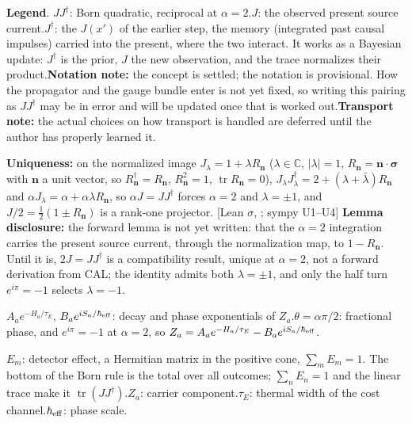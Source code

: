 \documentclass[10pt]{article}
\newcommand{\Cp}{\mathbb{C}}
\newcommand{\tr}{\operatorname{tr}}
\newcommand{\vs}[1]{\mathbf{#1}\!\cdot\!\boldsymbol\sigma}
\newcommand{\lean}[1]{\texttt{\detokenize{#1}}}
\newcommand{\tg}[1]{{\scriptsize[#1]}}
\begin{document}
\vspace{1pt}
\begin{smallbox}
\textbf{Legend}. $JJ^\dagger$: Born quadratic, reciprocal at $\alpha=2$.\quad $J$: the observed present source current.\quad $J^\dagger$: the $J(x')$ of the earlier step, the memory (integrated past causal impulses) carried into the present, where the two interact. It works as a Bayesian update: $J^\dagger$ is the prior, $J$ the new observation, and the trace normalizes their product.\quad \textbf{Notation note:} the concept is settled; the notation is provisional. How the propagator and the gauge bundle enter is not yet fixed, so writing this pairing as $JJ^\dagger$ may be in error and will be updated once that is worked out.\quad \textbf{Transport note:} the actual choices on how transport is handled are deferred until the author has properly learned it.\par\vspace{1pt}
\textbf{Uniqueness:} on the normalized image $J_\lambda=1+\lambda R_{\mathbf n}$ ($\lambda\in\Cp$, $|\lambda|=1$, $R_{\mathbf n}=\vs n$ with $\mathbf n$ a unit vector, so $R_{\mathbf n}^\dagger=R_{\mathbf n}$, $R_{\mathbf n}^2=1$, $\tr R_{\mathbf n}=0$), $J_\lambda J_\lambda^\dagger=2+(\lambda+\bar\lambda)R_{\mathbf n}$ and $\alpha J_\lambda=\alpha+\alpha\lambda R_{\mathbf n}$, so $\alpha J=JJ^\dagger$ forces $\alpha=2$ and $\lambda=\pm1$, and $J/2=\tfrac12(1\pm R_{\mathbf n})$ is a rank-one projector. \tg{Lean \lean{uniq_alpha_dot}$\sigma$, \lean{uniq_projector}; sympy U1--U4} \textbf{Lemma disclosure:} the forward lemma is not yet written: that the $\alpha=2$ integration carries the present source current, through the normalization map, to $1-R_{\mathbf n}$. Until it is, $2J=JJ^\dagger$ is a compatibility result, unique at $\alpha=2$, not a forward derivation from CAL; the identity admits both $\lambda=\pm1$, and only the half turn $e^{i\pi}=-1$ selects $\lambda=-1$.\par\vspace{1pt}
$A_ae^{-H_a/\tau_E}$, $B_ae^{iS_a/\hbar_{\rm eff}}$: decay and phase exponentials of $Z_a$.\quad $\theta=\alpha\pi/2$: fractional phase, and $e^{i\pi}=-1$ at $\alpha=2$, so $Z_a=A_ae^{-H_a/\tau_E}-B_ae^{iS_a/\hbar_{\rm eff}}$.\par\vspace{1pt}
$E_m$: detector effect, a Hermitian matrix in the positive cone, $\sum_mE_m=1$. The bottom of the Born rule is the total over all outcomes; $\sum_nE_n=1$ and the linear trace make it $\tr(JJ^\dagger)$.\quad $Z_a$: carrier component.\quad $\tau_E$: thermal width of the cost channel.\quad $\hbar_{\rm eff}$: phase scale.
\end{smallbox}
\end{document}
